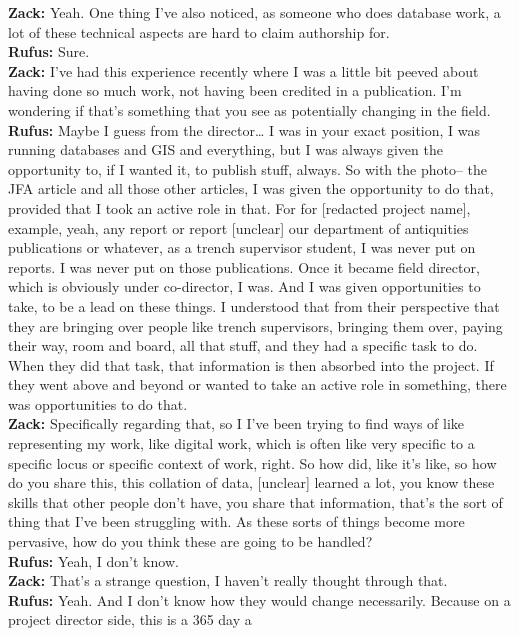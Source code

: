 \documentclass[
  canadian,
]{article}
\begin{document}
\textbf{Zack:} Yeah. One thing I've also noticed, as someone who does
database work, a lot of these technical aspects are hard to claim
authorship for.\\
\textbf{Rufus:} Sure.\\
\textbf{Zack:} I've had this experience recently where I was a little
bit peeved about having done so much work, not having been credited in a
publication. I'm wondering if that's something that you see as
potentially changing in the field.\\
\textbf{Rufus:} Maybe I guess from the director\ldots{} I was in your
exact position, I was running databases and GIS and everything, but I
was always given the opportunity to, if I wanted it, to publish stuff,
always. So with the photo-- the JFA article and all those other
articles, I was given the opportunity to do that, provided that I took
an active role in that. For for {[}redacted project name{]}, example,
yeah, any report or report {[}unclear{]} our department of antiquities
publications or whatever, as a trench supervisor student, I was never
put on reports. I was never put on those publications. Once it became
field director, which is obviously under co-director, I was. And I was
given opportunities to take, to be a lead on these things. I understood
that from their perspective that they are bringing over people like
trench supervisors, bringing them over, paying their way, room and
board, all that stuff, and they had a specific task to do. When they did
that task, that information is then absorbed into the project. If they
went above and beyond or wanted to take an active role in something,
there was opportunities to do that.\\
\textbf{Zack:} Specifically regarding that, so I I've been trying to
find ways of like representing my work, like digital work, which is
often like very specific to a specific locus or specific context of
work, right. So how did, like it's like, so how do you share this, this
collation of data, {[}unclear{]} learned a lot, you know these skills
that other people don't have, you share that information, that's the
sort of thing that I've been struggling with. As these sorts of things
become more pervasive, how do you think these are going to be handled?\\
\textbf{Rufus:} Yeah, I don't know.\\
\textbf{Zack:} That's a strange question, I haven't really thought
through that.\\
\textbf{Rufus:} Yeah. And I don't know how they would change
necessarily. Because on a project director side, this is a 365 day a
\end{document}
